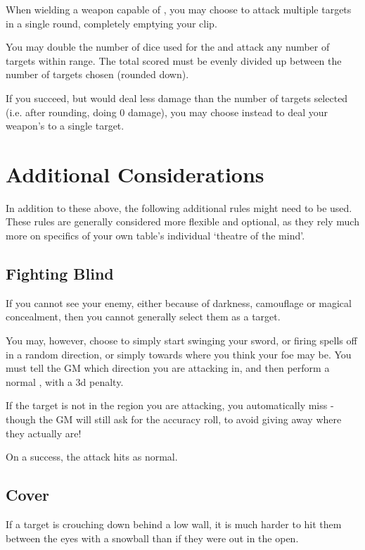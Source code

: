 When wielding a weapon capable of , you may choose to attack multiple targets in a single round, completely emptying your clip. 

You may double the number of dice used for the  and attack any number of targets within range. The total  scored must be evenly divided up between the number of targets chosen (rounded down). 

If you succeed, but would deal less damage than the number of targets selected (i.e. after rounding, doing 0 damage), you may choose instead to deal your weapon's  to a single target. 



\section{Additional Considerations}

In addition to these above, the following additional rules might need to be used. These rules are generally considered more flexible and optional, as they rely much more on specifics of your own table's individual `theatre of the mind'.

\subsection{Fighting Blind}\label{S:Unseen}

If you cannot see your enemy, either because of darkness, camouflage or magical concealment, then you cannot generally select them as a target. 

You may, however, choose to simply start swinging your sword, or firing spells off in a random direction, or simply towards where you think your foe may be. You must tell the GM which direction you are attacking in, and then perform a normal , with a 3d penalty.

If the target is not in the region  you are attacking, you automatically miss - though the GM will still ask for the accuracy roll, to avoid giving away where they actually are!

On a success, the attack hits as normal.  

\subsection{Cover}

If a target is crouching down behind a low wall, it is much harder to hit them between the eyes with a snowball than if they were out in the open. 

